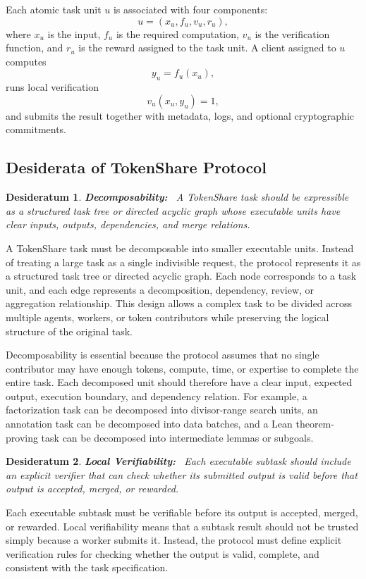 \documentclass{article}
\theoremstyle{plain}
\newtheorem{desideratum}{Desideratum}
\begin{document}
Each atomic task unit $u$ is associated with four components:
\[
u = (x_u, f_u, v_u, r_u),
\]
where $x_u$ is the input, $f_u$ is the required computation, $v_u$ is the verification function, and $r_u$ is the reward assigned to the task unit. A client assigned to $u$ computes
\[
y_u = f_u(x_u),
\]
runs local verification
\[
v_u(x_u, y_u) = 1,
\]
and submits the result together with metadata, logs, and optional cryptographic commitments.



\subsection{Desiderata of TokenShare Protocol}


\begin{desideratum}
\textbf{Decomposability:}~ A TokenShare task should be expressible as a structured task tree or directed acyclic graph whose executable units have clear inputs, outputs, dependencies, and merge relations.
\end{desideratum}

A TokenShare task must be decomposable into smaller executable units. Instead of treating a large task as a single indivisible request, the protocol represents it as a structured task tree or directed acyclic graph. Each node corresponds to a task unit, and each edge represents a decomposition, dependency, review, or aggregation relationship. This design allows a complex task to be divided across multiple agents, workers, or token contributors while preserving the logical structure of the original task.

Decomposability is essential because the protocol assumes that no single contributor may have enough tokens, compute, time, or expertise to complete the entire task. Each decomposed unit should therefore have a clear input, expected output, execution boundary, and dependency relation. For example, a factorization task can be decomposed into divisor-range search units, an annotation task can be decomposed into data batches, and a Lean theorem-proving task can be decomposed into intermediate lemmas or subgoals.


\begin{desideratum}
\textbf{Local Verifiability:}~ Each executable subtask should include an explicit verifier that can check whether its submitted output is valid before that output is accepted, merged, or rewarded.
\end{desideratum}

Each executable subtask must be verifiable before its output is accepted, merged, or rewarded. Local verifiability means that a subtask result should not be trusted simply because a worker submits it. Instead, the protocol must define explicit verification rules for checking whether the output is valid, complete, and consistent with the task specification.
\end{document}
